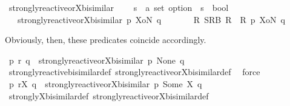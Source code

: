 \begin{isabellebody}
\begin{isamarkuptext}
\end{isamarkuptext}\isamarkuptrue%
\isamarkupfalse%
\ strongly{\isacharunderscore}{\kern0pt}reactive{\isacharunderscore}{\kern0pt}or{\isacharunderscore}{\kern0pt}X{\isacharunderscore}{\kern0pt}bisimilar\ \isanewline
\ \ {\isacharcolon}{\kern0pt}{\isacharcolon}{\kern0pt}\ {\isacartoucheopen}{\isacharprime}{\kern0pt}s\ {\isasymRightarrow}\ {\isacharprime}{\kern0pt}a\ set\ option\ {\isasymRightarrow}\ {\isacharprime}{\kern0pt}s\ {\isasymRightarrow}\ bool{\isacartoucheclose}\isanewline
\ \ \ {\isacartoucheopen}strongly{\isacharunderscore}{\kern0pt}reactive{\isacharunderscore}{\kern0pt}or{\isacharunderscore}{\kern0pt}X{\isacharunderscore}{\kern0pt}bisimilar\ p\ XoN\ q\ \isanewline
\ \ \ \ {\isasymequiv}\ {\isasymexists}\ R{\isachardot}{\kern0pt}\ SRB\ R\ {\isasymand}\ R\ p\ XoN\ q{\isacartoucheclose}%
\begin{isamarkuptext}%
Obviously, then, these predicates coincide accordingly.%
\end{isamarkuptext}\isamarkuptrue%
\isamarkupfalse%
\ {\isacartoucheopen}p\ {\isasymleftrightarrow}\isactrlsub r\ q\ {\isasymLongleftrightarrow}\ strongly{\isacharunderscore}{\kern0pt}reactive{\isacharunderscore}{\kern0pt}or{\isacharunderscore}{\kern0pt}X{\isacharunderscore}{\kern0pt}bisimilar\ p\ None\ q{\isacartoucheclose}\isanewline
%
\isadelimproof
\ \ %
\endisadelimproof
%
\isatagproof
{}\isamarkupfalse%
\ strongly{\isacharunderscore}{\kern0pt}reactive{\isacharunderscore}{\kern0pt}bisimilar{\isacharunderscore}{\kern0pt}def\ strongly{\isacharunderscore}{\kern0pt}reactive{\isacharunderscore}{\kern0pt}or{\isacharunderscore}{\kern0pt}X{\isacharunderscore}{\kern0pt}bisimilar{\isacharunderscore}{\kern0pt}def\ \isamarkupfalse%
\ force%
\endisatagproof
{\isafoldproof}%
%
\isadelimproof
\isanewline
%
\endisadelimproof
{}\isamarkupfalse%
\ {\isacartoucheopen}p\ {\isasymleftrightarrow}\isactrlsub r\isactrlsup X\ q\ {\isasymLongleftrightarrow}\ strongly{\isacharunderscore}{\kern0pt}reactive{\isacharunderscore}{\kern0pt}or{\isacharunderscore}{\kern0pt}X{\isacharunderscore}{\kern0pt}bisimilar\ p\ {\isacharparenleft}{\kern0pt}Some\ X{\isacharparenright}{\kern0pt}\ q{\isacartoucheclose}\isanewline
%
\isadelimproof
\ \ %
\endisadelimproof
%
\isatagproof
{}\isamarkupfalse%
\ strongly{\isacharunderscore}{\kern0pt}X{\isacharunderscore}{\kern0pt}bisimilar{\isacharunderscore}{\kern0pt}def\ strongly{\isacharunderscore}{\kern0pt}reactive{\isacharunderscore}{\kern0pt}or{\isacharunderscore}{\kern0pt}X{\isacharunderscore}{\kern0pt}bisimilar{\isacharunderscore}{\kern0pt}def\ \isamarkupfalse%

\end{isabellebody}

